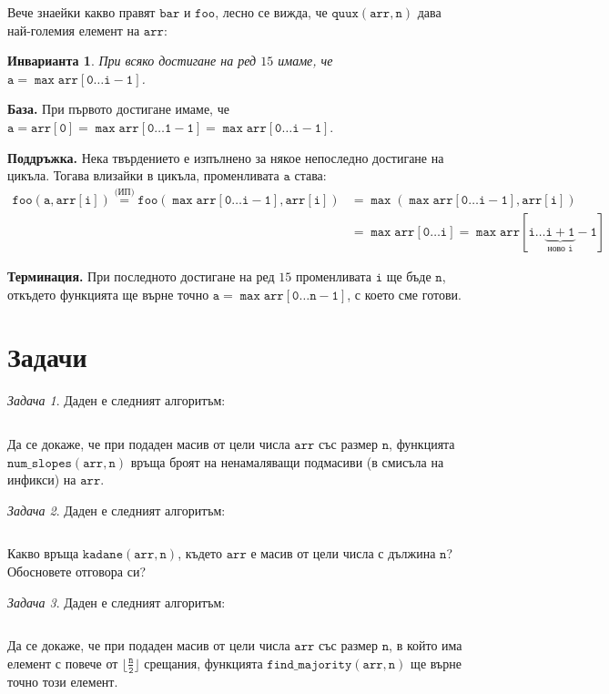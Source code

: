 \documentclass{article}
\theoremstyle{definition}
\theoremstyle{plain}
\newtheorem*{invariant}{Инварианта}
\theoremstyle{remark}
\newtheorem{problem}{Задача}
\theoremstyle{definition}
\begin{document}
Вече знаейки какво правят $\mathtt{bar}$ и $\mathtt{foo}$, лесно се вижда, че $\mathtt{quux(arr, n)}$ дава най-големия елемент на $\mathtt{arr}$:
\begin{invariant}
    При всяко достигане на ред $15$ имаме, че $\mathtt{a = \max arr[0 \dots i - 1]}$.
\end{invariant}

\textbf{База.}
При първото достигане имаме, че $\mathtt{a = arr[0] = \max arr[0 \dots 1 - 1] = \max arr[0 \dots i - 1]}$.

\textbf{Поддръжка.}
Нека твърдението е изпълнено за някое непоследно достигане на цикъла.
Тогава влизайки в цикъла, променливата $\mathtt{a}$ става:
\begin{align*}
    \mathtt{foo(a, arr[i]) \stackrel{\text{(ИП)}}{=} foo(\max arr[0 \dots i - 1], arr[i])} & = \mathtt{\max (\max arr[0 \dots i - 1], arr[i])}                                                  \\
                                                                                           & =\mathtt{\max arr[0 \dots i] = \max arr[i \dots \underbrace{\mathtt{i + 1}}_{\text{ново } i} - 1]}
\end{align*}

\textbf{Терминация.}
При последното достигане на ред $15$ променливата $\mathtt{i}$ ще бъде $\mathtt{n}$, откъдето функцията ще върне точно $\mathtt{a = \max arr[0 \dots n - 1]}$, с което сме готови.

\section*{Задачи}

\begin{problem}
Даден е следният алгоритъм:
\inputminted[linenos]{c++}{algorithms/num_slopes.cpp}

Да се докаже, че при подаден масив от цели числа $\mathtt{arr}$ със размер $\mathtt{n}$, функцията $\mathtt{num\_slopes(arr, n)}$ връща броят на ненамаляващи подмасиви (в смисъла на инфикси) на $\mathtt{arr}$.
\end{problem}


\begin{problem}
Даден е следният алгоритъм:
\inputminted[linenos]{c++}{algorithms/kadane.cpp}

Какво връща $\mathtt{kadane(arr, n)}$, където $\mathtt{arr}$ е масив от цели числа с дължина $\mathtt{n}$?
Обосновете отговора си?
\end{problem}

\begin{problem}
Даден е следният алгоритъм:
\inputminted[linenos]{c++}{algorithms/find_majority.cpp}

Да се докаже, че при подаден масив от цели числа $\mathtt{arr}$ със размер $\mathtt{n}$, в който има елемент с повече от $\mathtt{\lfloor \frac{n}{2} \rfloor}$ срещания,
функцията $\mathtt{find\_majority(arr, n)}$ ще върне точно този елемент.
\end{problem}
\end{document}
